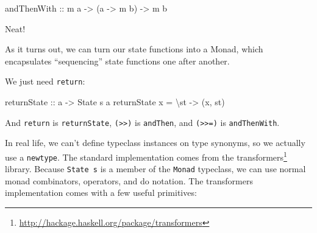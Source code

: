 \documentclass[]{article}
\newenvironment{Shaded}{}{}
\newcommand{\DataTypeTok}[1]{\textcolor[rgb]{0.56,0.13,0.00}{#1}}
\newcommand{\NormalTok}[1]{#1}
\newcommand{\OtherTok}[1]{\textcolor[rgb]{0.00,0.44,0.13}{#1}}
\renewcommand{\href}[2]{#2\footnote{\url{#1}}}
\begin{document}
\begin{Shaded}
\begin{Highlighting}[]
\OtherTok{andThenWith ::}\NormalTok{ m a }\OtherTok{{-}>}\NormalTok{ (a }\OtherTok{{-}>}\NormalTok{ m b) }\OtherTok{{-}>}\NormalTok{ m b}
\end{Highlighting}
\end{Shaded}

Neat!

As it turns out, we can turn our state functions into a Monad, which
encapsulates ``sequencing'' state functions one after another.

We just need \texttt{return}:

\begin{Shaded}
\begin{Highlighting}[]
\OtherTok{returnState ::}\NormalTok{ a }\OtherTok{{-}>} \DataTypeTok{State}\NormalTok{ s a}
\NormalTok{returnState x }\OtherTok{=}\NormalTok{ \textbackslash{}st }\OtherTok{{-}>}\NormalTok{ (x, st)}
\end{Highlighting}
\end{Shaded}

And \texttt{return} is \texttt{returnState},
\texttt{(\textgreater{}\textgreater{})} is \texttt{andThen}, and
\texttt{(\textgreater{}\textgreater{}=)} is \texttt{andThenWith}.

In real life, we can't define typeclass instances on type synonyms, so we
actually use a \texttt{newtype}. The standard implementation comes from the
\href{http://hackage.haskell.org/package/transformers}{transformers} library.
Because \texttt{State\ s} is a member of the \texttt{Monad} typeclass, we can
use normal monad combinators, operators, and do notation. The transformers
implementation comes with a few useful primitives:
\end{document}
